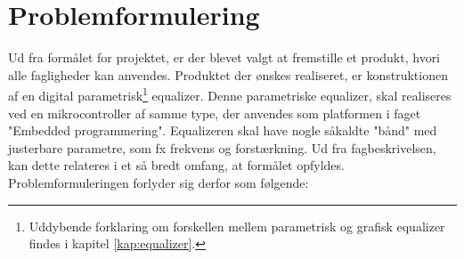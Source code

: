 \section{Problemformulering}
%
%


%
Ud fra formålet for projektet, er der blevet valgt at fremstille et produkt, hvori alle fagligheder kan anvendes. 
Produktet der ønskes realiseret, er konstruktionen af en digital parametrisk\footnote{Uddybende forklaring om forskellen mellem parametrisk og grafisk equalizer findes i kapitel \ref{kap:equalizer}.} equalizer. 
Denne parametriske equalizer, skal realiseres ved en mikrocontroller af samme type, der anvendes som platformen i faget "Embedded programmering".
Equalizeren skal have nogle såkaldte "bånd" med justerbare parametre, som fx frekvens og forstærkning. 
Ud fra fagbeskrivelsen, kan dette relateres i et så bredt omfang, at formålet opfyldes. 
Problemformuleringen forlyder sig derfor som følgende: \\

